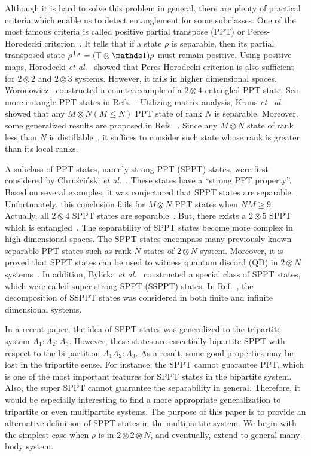 Although it is hard to solve this problem in general, there are plenty of  practical criteria which enable us to detect
entanglement for some subclasses.  One of the most famous criteria  is called positive
partial transpose (PPT)  or Peres-Horodecki criterion~\cite{Peres1996a}.  It tells  that if a state
$\rho$ is separable, then its partial transposed state $\rho^{\intercal_{A}} = (\intercal \otimes\I)\rho$ must remain
positive.
Using positive
maps, Horodecki {\sl et al.}~\cite{horodecki1996separability} showed that Peres-Horodecki criterion is also sufficient
for $2\otimes 2$ and $2\otimes 3$  systems. However, it fails in  higher dimensional spaces.
Woronowicz~\cite{Woronowikz1976} constructed a counterexample of a $2\otimes 4$ entangled PPT state. See more entangle
PPT states in Refs.~\cite{Choi1982,Strmer1963,Horodecki1997}.  Utilizing matrix analysis, Kraus {\sl et \
  al.}~\cite{Kraus2000} showed that any $M\otimes N (M\leqslant N)$  PPT state of rank $N$ is separable. Moreover, some generalized
results  are proposed in Refs.~\cite{Horodecki2000,Karnas2001,Fei2003}. Since any $M\otimes N$ state of rank less than
$N$ is distillable~\cite{horodecki2003rank}, it suffices to consider such state whose rank is greater than its local
ranks.


A subclass of PPT states, namely strong PPT (SPPT) states, were first considered by  {Chru\'sci\'nski} {\sl
  et al.}~\cite{Chruscinski2008}. These states have a ``strong PPT property''. Based on several examples, it was
conjectured that SPPT states are separable. Unfortunately, this conclusion fails for  $M\otimes N$ PPT states when
$NM\geqslant 9$. Actually, all $2\otimes 4$ SPPT states are separable~\cite{Ha2012}. But, there exists a $2\otimes 5$ SPPT
which is entangled~\cite{Ha2012}. The separability of SPPT states become more complex in high dimensional spaces. The
SPPT states encompass many previously known separable PPT states such as rank $N$ states of $2\otimes N$
system. Moreover, it is proved that SPPT states can be used to witness quantum discord (QD) in $2\otimes N$
systems~\cite{Bylicka2010}.  In addition, Bylicka {\sl et al.}~\cite{Bylicka2013} constructed  a special class of SPPT
states, which were called super strong SPPT (SSPPT) states.  In Ref.~\cite{Guo2012}, the
decomposition of SSPPT states was considered in both finite and infinite dimensional systems.


In a recent paper\cite{SPPT3partite}, the idea of SPPT states was generalized to the tripartite system
$A_{1}:A_{2}:A_{3}$. However, these states are essentially  bipartite SPPT  with respect to the bi-partition
$A_{1}A_{2}:A_{3}$. As a result, some good properties may be lost in the tripartite sense. For instance, 
the SPPT cannot guarantee PPT, which is one of the
most important features for SPPT states in the bipartite system.
Also, the super SPPT cannot  guarantee the separability in general.
Therefore, it would be especially interesting to find a more appropriate generalization to tripartite or even
multipartite systems.  The purpose of this paper is to provide an alternative definition of SPPT states in the multipartite
system. We begin with the simplest case when $\rho $ is in $2\otimes 2 \otimes N $,  and eventually, extend  to general many-body
system.


